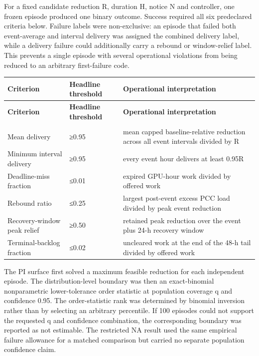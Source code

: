 \documentclass[10pt,a4paper]{article}
\begin{document}
For a fixed candidate reduction R, duration H, notice N and controller, one frozen episode produced one binary outcome. Success required all six predeclared criteria below. Failure labels were non-exclusive: an episode that failed both event-average and interval delivery was assigned the combined delivery label, while a delivery failure could additionally carry a rebound or window-relief label. This prevents a single episode with several operational violations from being reduced to an arbitrary first-failure code.


{\footnotesize
\renewcommand{\arraystretch}{1.12}
\begin{longtable}{@{}>{\RaggedRight\arraybackslash}p{}>{\RaggedRight\arraybackslash}p{}>{\RaggedRight\arraybackslash}p{}@{}}
\toprule
\textbf{Criterion} & \textbf{Headline threshold} & \textbf{Operational interpretation} \\
\midrule
\endfirsthead
\toprule
\textbf{Criterion} & \textbf{Headline threshold} & \textbf{Operational interpretation} \\
\midrule
\endhead
\midrule \multicolumn{3}{r}{\scriptsize continued on next page} \\
\endfoot
\bottomrule
\endlastfoot
Mean delivery & ≥0.95 & mean capped baseline-relative reduction across all event intervals divided by R \\
Minimum interval delivery & ≥0.95 & every event hour delivers at least 0.95R \\
Deadline-miss fraction & ≤0.01 & expired GPU-hour work divided by offered work \\
Rebound ratio & ≤0.25 & largest post-event excess PCC load divided by peak event reduction \\
Recovery-window peak relief & ≥0.50 & retained peak reduction over the event plus 24-h recovery window \\
Terminal-backlog fraction & ≤0.02 & uncleared work at the end of the 48-h tail divided by offered work \\
\end{longtable}
}

The PI surface first solved a maximum feasible reduction for each independent episode. The distribution-level boundary was then an exact-binomial nonparametric lower-tolerance order statistic at population coverage q and confidence 0.95. The order-statistic rank was determined by binomial inversion rather than by selecting an arbitrary percentile. If 100 episodes could not support the requested q and confidence combination, the corresponding boundary was reported as not estimable. The restricted NA result used the same empirical failure allowance for a matched comparison but carried no separate population confidence claim.
\end{document}
